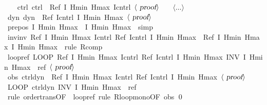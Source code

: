\documentclass[envcountsame]{llncs}
\begin{document}
\begin{example}
\begin{isabellebody}
\ \ \isamarkupfalse%
\ ctrl{\isacharcolon}\ {\isachardoublequoteopen}{\isacharquery}ctrl\ {\isasymle}\ Ref\ {\isasymlceil}I\ Hmin\ Hmax{\isasymrceil}\ {\isasymlceil}{\isacharquery}Icntrl{\isasymrceil}{\isachardoublequoteclose}\ $\langle \isa{proof}\rangle$\isanewline
\ \ \ $\langle \dots\rangle$\isanewline
\ \ \isamarkupfalse%
\ dyn{\isacharcolon}\ {\isachardoublequoteopen}{\isacharquery}dyn\ {\isasymle}\ Ref\ {\isasymlceil}{\isacharquery}Icntrl{\isasymrceil}\ {\isasymlceil}I\ Hmin\ Hmax{\isasymrceil}{\isachardoublequoteclose}\ $\langle \isa{proof}\rangle$\isanewline
\ \ \isanewline
\ \ \isamarkupfalse%
\ pre{\isacharunderscore}pos{\isacharcolon}\ {\isachardoublequoteopen}{\isasymlceil}I\ Hmin\ Hmax{\isasymrceil}\ {\isasymle}\ {\isasymlceil}I\ Hmin\ Hmax{\isasymrceil}{\isachardoublequoteclose}\ \isamarkupfalse\ simp\isanewline
\ \ \isamarkupfalse%
\ inv{\isacharunderscore}inv{\isacharcolon}\ {\isachardoublequoteopen}Ref\ {\isasymlceil}I\ Hmin\ Hmax{\isasymrceil}\ {\isasymlceil}{\isacharquery}Icntrl{\isasymrceil}{\isacharsemicolon}\ {\isacharparenleft}Ref\ {\isasymlceil}{\isacharquery}Icntrl{\isasymrceil}\ {\isasymlceil}I\ Hmin\ Hmax{\isasymrceil}{\isacharparenright}\ {\isasymle}\ Ref\ {\isasymlceil}I\ Hmin\ Hmax{\isasymrceil}\ {\isasymlceil}I\ Hmin\ Hmax{\isasymrceil}{\isachardoublequoteclose}\ \isamarkupfalse\ {\isacharparenleft}rule\ R{\isacharunderscore}comp{\isacharparenright}\isanewline
\ \ \isamarkupfalse%
\ loopref{\isacharcolon}\ {\isachardoublequoteopen}LOOP\ Ref\ {\isasymlceil}I\ Hmin\ Hmax{\isasymrceil}\ {\isasymlceil}{\isacharquery}Icntrl{\isasymrceil}{\isacharsemicolon}\ {\isacharparenleft}Ref\ {\isasymlceil}{\isacharquery}Icntrl{\isasymrceil}\ {\isasymlceil}I\ Hmin\ Hmax{\isasymrceil}{\isacharparenright}\ INV\ I\ Hmin\ Hmax\ {\isasymle}\ {\isacharquery}ref{\isachardoublequoteclose}\ $\langle \isa{proof}\rangle$\isanewline
\ \ \isamarkupfalse%
\ obs{\isacharcolon}\ {\isachardoublequoteopen}{\isacharquery}ctrl{\isacharsemicolon}{\isacharquery}dyn\ {\isasymle}\ Ref\ {\isasymlceil}I\ Hmin\ Hmax{\isasymrceil}\ {\isasymlceil}{\isacharquery}Icntrl{\isasymrceil}{\isacharsemicolon}\ {\isacharparenleft}Ref\ {\isasymlceil}{\isacharquery}Icntrl{\isasymrceil}\ {\isasymlceil}I\ Hmin\ Hmax{\isasymrceil}{\isacharparenright}{\isachardoublequoteclose}\ $\langle \isa{proof}\rangle$\isanewline
\ \ \isamarkupfalse%
\ {\isachardoublequoteopen}LOOP\ {\isacharparenleft}{\isacharquery}ctrl{\isacharsemicolon}{\isacharquery}dyn{\isacharparenright}\ INV\ I\ Hmin\ Hmax\ {\isasymle}\ {\isacharquery}ref{\isachardoublequoteclose}\isanewline
\ \ \ \ \isamarkupfalse%
\ {\isacharparenleft}rule\ order{\isacharunderscore}trans{\isacharbrackleft}OF\ {\isacharunderscore}\ loopref{\isacharbrackright}{\isacharcomma}\ rule\ R{\isacharunderscore}loop{\isacharunderscore}mono{\isacharbrackleft}OF\ obs{\isacharbrackright}{\isacharparenright}\isanewline
{}\qed
\end{isabellebody}
\end{example}
\end{document}
